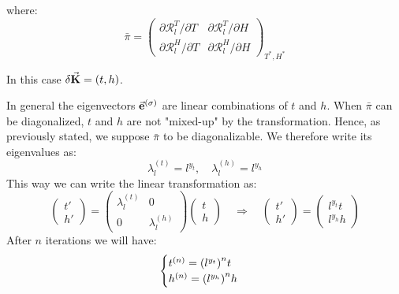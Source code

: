 \documentclass[../../Main/Main.tex]{subfiles}
\begin{document}
where:
\begin{equation}
  \bar{\pi } =
  \begin{pmatrix}
    \partial{\mathcal{R}_l^T} / \partial{T}  & \partial{\mathcal{R}_l^T} / \partial{H} \\
     \partial{\mathcal{R}_l^H} / \partial{T}  &\partial{\mathcal{R}_l^H} / \partial{H}
  \end{pmatrix}_{T^*,H^*}
\end{equation}
\begin{remark}
In this case \( \delta \va{K}  = (t,h) \).
\end{remark}

In general the eigenvectors \( \va{e}^{(\sigma )} \) are linear combinations of \( t \) and \( h \). When \( \bar{\pi }  \) can be diagonalized, \( t \) and \( h \) are not "mixed-up" by the transformation. Hence, as previously stated, we suppose \( \bar{\pi }  \) to be diagonalizable. We therefore write its eigenvalues as:
\begin{equation}
  \lambda _l ^{(t)} = l^{y_t}, \quad \lambda _l^{(h)} = l ^{y_h}
\end{equation}
This way we can write the linear transformation as:
\begin{equation}
  \begin{pmatrix}
  t' \\
  h'
  \end{pmatrix}
  =
  \begin{pmatrix}
  \lambda _l^{(t)}   & 0 \\
    0 & \lambda _l^{(h)}
  \end{pmatrix}
  \begin{pmatrix}
  t \\
  h
  \end{pmatrix} \quad \Rightarrow \quad
  \begin{pmatrix}
  t' \\
  h'
  \end{pmatrix}
  =
  \begin{pmatrix}
  l^{y_t} t \\
  l ^{y_h} h
  \end{pmatrix}
\end{equation}
After \( n \) iterations we will have:
\begin{equation}
  \begin{cases}
   t^{(n)} = \qty(l^{y_t})^n t  \\
  h^{(n)} = \qty(l^{y_h})^n h
  \end{cases}
\end{equation}
\end{document}

